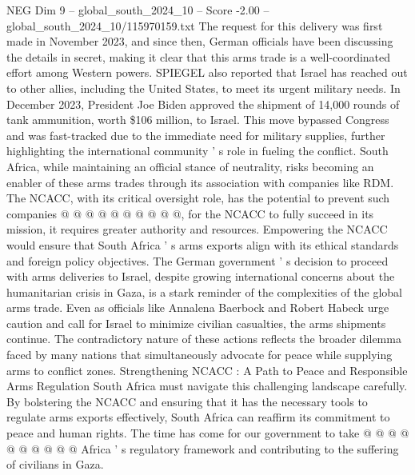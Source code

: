 \begin{textsample}{NEG Dim 9 – global\_south\_2024\_10 – Score -2.00 – global\_south\_2024\_10/115970159.txt}
The request for this delivery was first made in November 2023, and since then, German officials have been discussing the details in secret, making it clear that this arms trade is a well-coordinated effort among Western powers.
SPIEGEL also reported that Israel has reached out to other allies, including the United States, to meet its urgent military needs.
In December 2023, President Joe Biden approved the shipment of 14,000 rounds of tank ammunition, worth \$106 million, to Israel.
This move bypassed Congress and was fast-tracked due to the immediate need for military supplies, further highlighting the international community ' s role in fueling the conflict.
South Africa, while maintaining an official stance of neutrality, risks becoming an enabler of these arms trades through its association with companies like RDM.
The NCACC, with its critical oversight role, has the potential to prevent such companies @ @ @ @ @ @ @ @ @ @, for the NCACC to fully succeed in its mission, it requires greater authority and resources.
Empowering the NCACC would ensure that South Africa ' s arms exports align with its ethical standards and foreign policy objectives.
The German government ' s decision to proceed with arms deliveries to Israel, despite growing international concerns about the humanitarian crisis in Gaza, is a stark reminder of the complexities of the global arms trade.
Even as officials like Annalena Baerbock and Robert Habeck urge caution and call for Israel to minimize civilian casualties, the arms shipments continue.
The contradictory nature of these actions reflects the broader dilemma faced by many nations that simultaneously advocate for peace while supplying arms to conflict zones.
Strengthening NCACC : A Path to Peace and Responsible Arms Regulation South Africa must navigate this challenging landscape carefully.
By bolstering the NCACC and ensuring that it has the necessary tools to regulate arms exports effectively, South Africa can reaffirm its commitment to peace and human rights.
The time has come for our government to take @ @ @ @ @ @ @ @ @ @ Africa ' s regulatory framework and contributing to the suffering of civilians in Gaza.

\end{textsample}
